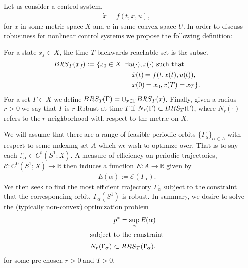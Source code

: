 Let us consider a control system, 
\begin{align}
	\dot{x} = f(t,x,u), \label{eq:control system}
\end{align}
 for $x$ in some metric space $X$ and $u$ in some convex space $U$.
 In order to discuss robustness for nonlinear control systems we propose the following definition:
\begin{definition}
	For a state $x_{f} \in X$, the time-$T$ backwards reachable set is the subset
	\begin{align*}
		BRS_{T}( x_{f} ) := \{ x_{0} \in X \mid& \exists u(\cdot) , x(\cdot) \text{ such that } \\
			&\quad \dot{x}(t) = f(t,x(t),u(t)) ,\\
			&\quad x(0) = x_{0}, x(T) = x_{T}  \}.
	\end{align*}
	For a set $\Gamma \subset X$ we define $BRS_{T}(\Gamma) = \cup_{x \in \Gamma} BRS_{T}(x)$.
	Finally, given a radius $r > 0$ we say that $\Gamma$ is $r$-Robust at time $T$ if $N_{r}( \Gamma) \subset BRS_{T}( \Gamma )$,
	where $N_{r}( \cdot)$ refers to the $r$-neighborhood with respect to the metric on $X$.
\end{definition}

We will assume that there are a range of feasible periodic orbits $\{ \Gamma_{\alpha} \}_{\alpha \in A}$ with respect to some indexing set $A$
which we wish to optimize over.
That is to say each $\Gamma_{\alpha} \in C^{0}( S^{1} ; X)$.
A measure of efficiency on periodic trajectories, $\mathcal{E}: C^{0}( S^{1} ; X) \to \mathbb{R}$ then induces a function $E:A\to \mathbb{R}$ given by
\begin{align*}
	E( \alpha) := \mathcal{E}( \Gamma_{\alpha}).
\end{align*}
We then seek to find the most efficient trajectory $\Gamma_{\alpha}$ subject to the constraint that the corresponding orbit, $\Gamma_{\alpha}(S^{1})$ is robust.
In summary, we desire to solve the (typically non-convex) optimization problem
\begin{align}
	p^{*} = \sup_{\alpha} E(\alpha) \label{eq:nonconvex}\\
\intertext{subject to the constraint}
	N_{r}(\Gamma_{\alpha}) \subset BRS_{T}(\Gamma_{\alpha}). \nonumber
\end{align}
for some pre-chosen $r >0$ and $T>0$.